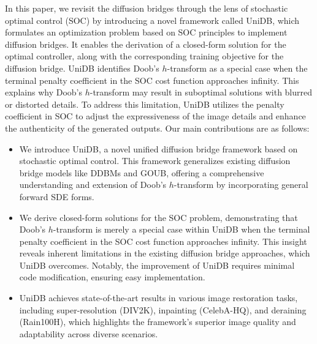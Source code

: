 
In this paper, we revisit the diffusion bridges through the lens of stochastic optimal control (SOC) by introducing a novel framework called UniDB, which formulates an optimization problem based on SOC principles to implement diffusion bridges. It enables the derivation of a closed-form solution for the optimal controller, along with the corresponding training objective for the diffusion bridge. UniDB identifies Doob's $h$-transform as a special case when the terminal penalty coefficient in the SOC cost function approaches infinity. This explains why Doob's $h$-transform may result in suboptimal solutions with blurred or distorted details. To address this limitation, UniDB utilizes the penalty coefficient in SOC to adjust the expressiveness of the image details and enhance the authenticity of the generated outputs. Our main contributions are as follows: 

\begin{itemize}

\vspace{-4mm}
\item We introduce UniDB, a novel unified diffusion bridge framework based on stochastic optimal control. This framework generalizes existing diffusion bridge models like DDBMs and GOUB, offering a comprehensive understanding and extension of Doob’s $h$-transform by incorporating general forward SDE forms.

\vspace{-2mm}

\item We derive closed-form solutions for the SOC problem, demonstrating that Doob’s $h$-transform is merely a special case within UniDB when the terminal penalty coefficient in the SOC cost function approaches infinity. This insight reveals inherent limitations in the existing diffusion bridge approaches, which UniDB overcomes. Notably, the improvement of UniDB requires minimal code modification, ensuring easy implementation. 

\vspace{-2mm}

\item UniDB achieves state-of-the-art results in various image restoration tasks, including super-resolution (DIV2K), inpainting (CelebA-HQ), and deraining (Rain100H), which highlights the framework’s superior image quality and adaptability across diverse scenarios. 

\end{itemize}


